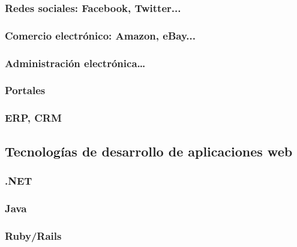 \documentclass[a4paper,11pt,spanish]{sphinxmanual}
\begin{document}
\subsubsection{Redes sociales: Facebook, Twitter...}
\label{\detokenize{introduccion:redes-sociales-facebook-twitter}}

\subsubsection{Comercio electrónico: Amazon, eBay...}
\label{\detokenize{introduccion:comercio-electronico-amazon-ebay}}

\subsubsection{Administración electrónica…}
\label{\detokenize{introduccion:administracion-electronica}}

\subsubsection{Portales}
\label{\detokenize{introduccion:portales}}

\subsubsection{ERP, CRM}
\label{\detokenize{introduccion:erp-crm}}

\subsection{Tecnologías de desarrollo de aplicaciones web}
\label{\detokenize{introduccion:tecnologias-de-desarrollo-de-aplicaciones-web}}

\subsubsection{.NET}
\label{\detokenize{introduccion:net}}

\subsubsection{Java}
\label{\detokenize{introduccion:java}}

\subsubsection{Ruby/Rails}
\label{\detokenize{introduccion:ruby-rails}}
\end{document}
